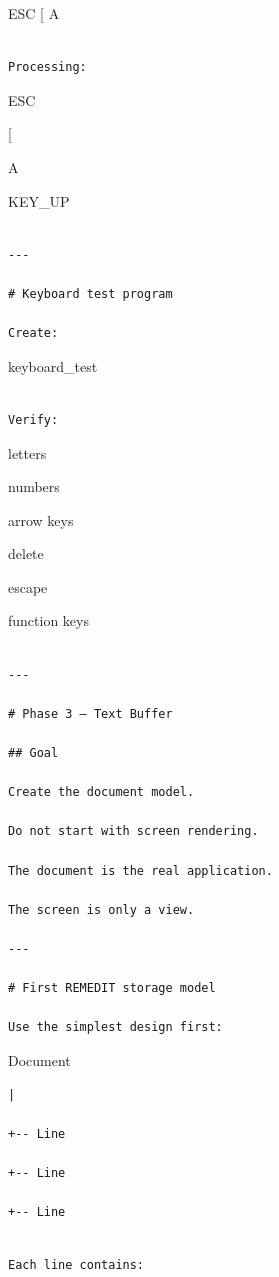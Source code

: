\documentclass[
  oneside,
  openany]{book}
\begin{document}
ESC {[} A

\begin{verbatim}

Processing:
\end{verbatim}

ESC

{[}

A

KEY\_UP

\begin{verbatim}

---

# Keyboard test program

Create:
\end{verbatim}

keyboard\_test

\begin{verbatim}

Verify:
\end{verbatim}

letters

numbers

arrow keys

delete

escape

function keys

\begin{verbatim}

---

# Phase 3 — Text Buffer

## Goal

Create the document model.

Do not start with screen rendering.

The document is the real application.

The screen is only a view.

---

# First REMEDIT storage model

Use the simplest design first:
\end{verbatim}

Document

\begin{verbatim}
|

+-- Line

+-- Line

+-- Line
\end{verbatim}

\begin{verbatim}

Each line contains:
\end{verbatim}
\end{document}
